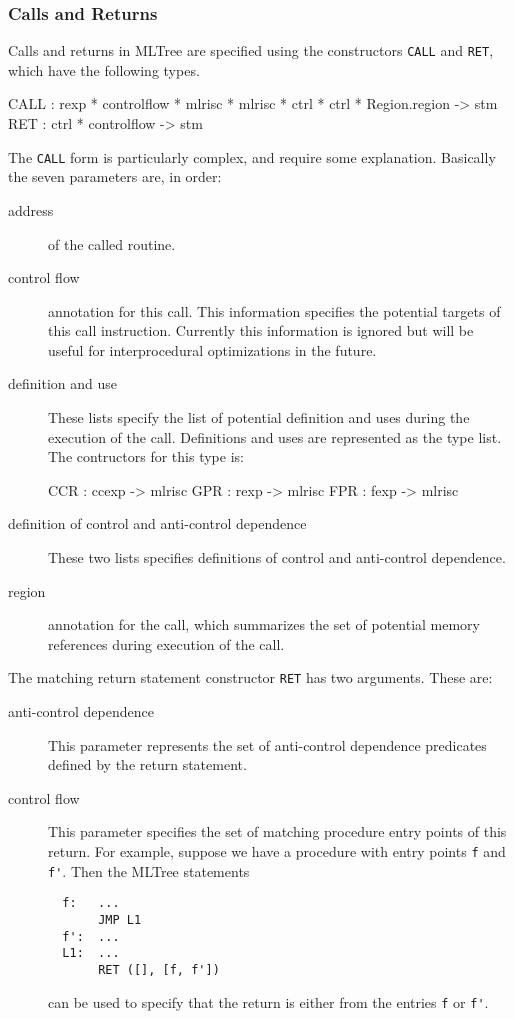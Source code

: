 \subsubsection{Calls and Returns}

Calls and returns in MLTree are specified using the constructors
\verb|CALL| and \verb|RET|, which have the following types.
\begin{SML}
   CALL : rexp * controlflow * mlrisc * mlrisc * 
          ctrl * ctrl * Region.region -> stm
   RET  : ctrl * controlflow -> stm
\end{SML}

The \verb|CALL| form is particularly complex, and require some explanation.
Basically the seven parameters are, in order:
\begin{description}
   \item[address] of the called routine.
   \item[control flow] annotation for this call.  This information 
specifies the potential targets of this call instruction.  Currently
this information is ignored but will be useful for interprocedural   
optimizations in the future.
   \item[definition and use]  These lists specify the list of
potential definition and uses during the execution of the call.
Definitions and uses are represented as the type  list.
The contructors for this type is:
\begin{SML}
  CCR : ccexp -> mlrisc
  GPR : rexp -> mlrisc
  FPR : fexp -> mlrisc
\end{SML}
   \item[definition of control and anti-control dependence] 
These two lists specifies definitions of control and anti-control dependence.
   \item[region] annotation for the call, which summarizes
the set of potential memory references during execution of the call.
\end{description}

The matching return statement constructor \verb|RET| has two
arguments.  These are:
\begin{description}
  \item[anti-control dependence]  This parameter represents
the set of anti-control dependence predicates defined by the return
statement.
  \item[control flow]  This parameter specifies the set of matching
procedure entry points of this return.  For example, suppose we have
a procedure with entry points \verb|f| and \verb|f'|.  
Then the MLTree statements 
\begin{verbatim}
  f:   ...
       JMP L1
  f':  ...
  L1:  ...
       RET ([], [f, f'])
\end{verbatim}
\noindent can be used to specify that the return is either from
the entries \verb|f| or \verb|f'|.  
\end{description}

